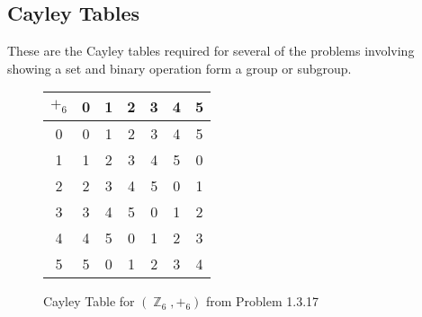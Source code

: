 \documentclass{amsbook}
\DeclareMathOperator{\Z}{\mathbb{Z}}
\begin{document}
		\subsection{Cayley Tables}
		\label{sub:cayley_tables}
		These are the Cayley tables required for several of the problems involving showing a set and binary operation form a group or subgroup.
		\begin{figure}[h]
			\begin{tabular}{c|cccccc}
				$+_{6}$ & 0 & 1 & 2 & 3 & 4 & 5 \\
				\hline
				0 & 0 & 1 & 2 & 3 & 4 & 5 \\
				1 & 1 & 2 & 3 & 4 & 5 & \color{red} 0 \color{black} \\
				2 & 2 & 3 & 4 & 5 & \color{red} 0 \color{black} & 1 \\
				3 & 3 & 4 & 5 & \color{red} 0 \color{black} & 1 & 2 \\
				4 & 4 & 5 & \color{red} 0 \color{black} & 1 & 2 & 3 \\
				5 & 5 & \color{red} 0 \color{black} & 1 & 2 & 3 & 4
			\end{tabular}
			\caption{Cayley Table for $(\Z_{6}, +_{6})$ from Problem 1.3.17}
			\label{117CT}
		\end{figure}
\end{document}
